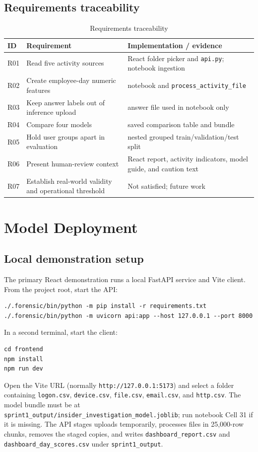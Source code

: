 \documentclass[12pt,a4paper,oneside]{report}
\begin{document}
\section{Requirements traceability}
\begin{table}[!htbp]
\centering
\caption{Requirements traceability}
\label{tab:req}
\small
\begin{tabularx}{\textwidth}{|p{}|p{}|X|}
\hline
ID & Requirement & Implementation / evidence\\
\hline
R01 & Read five activity sources & React folder picker and \texttt{api.py}; notebook ingestion\\
\hline
R02 & Create employee-day numeric features & notebook and \texttt{process\_activity\_file}\\
\hline
R03 & Keep answer labels out of inference upload & answer file used in notebook only\\
\hline
R04 & Compare four models & saved comparison table and bundle\\
\hline
R05 & Hold user groups apart in evaluation & nested grouped train/validation/test split\\
\hline
R06 & Present human-review context & React report, activity indicators, model guide, and caution text\\
\hline
R07 & Establish real-world validity and operational threshold & Not satisfied; future work\\
\hline
\end{tabularx}
\end{table}

\chapter{Model Deployment}
\section{Local demonstration setup}
The primary React demonstration runs a local FastAPI service and Vite
client. From the project root, start the API:
\begin{lstlisting}
./.forensic/bin/python -m pip install -r requirements.txt
./.forensic/bin/python -m uvicorn api:app --host 127.0.0.1 --port 8000
\end{lstlisting}
In a second terminal, start the client:
\begin{lstlisting}
cd frontend
npm install
npm run dev
\end{lstlisting}
Open the Vite URL (normally \texttt{http://127.0.0.1:5173}) and select a
folder containing \texttt{logon.csv}, \texttt{device.csv},
\texttt{file.csv}, \texttt{email.csv}, and \texttt{http.csv}. The model
bundle must be at
\texttt{sprint1\_output/insider\_investigation\_model.joblib}; run
notebook Cell 31 if it is missing. The API stages uploads temporarily,
processes files in 25,000-row chunks, removes the staged copies, and
writes \texttt{dashboard\_report.csv} and
\texttt{dashboard\_day\_scores.csv} under \texttt{sprint1\_output}.
\end{document}
